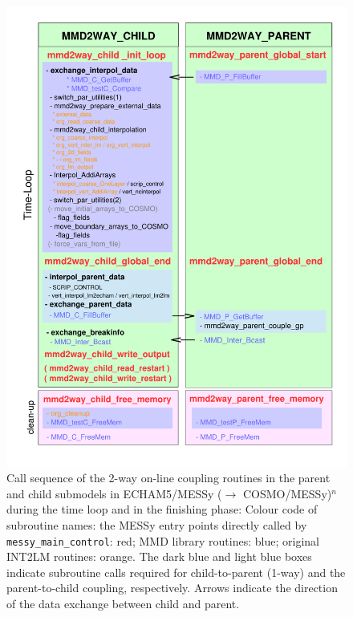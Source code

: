 \documentclass[11pt,twoside]{article}
\begin{document}
\begin{figure}
\begin{center} 
\vspace{-.3cm}
\includegraphics[height=0.9\textheight]{MMDUM_flowchart_timeloop.pdf} 
\end{center} 
\vspace{-.8cm}
\caption{Call sequence of the 2-way on-line coupling routines in the
parent and child submodels in 
ECHAM5/MESSy ($\rightarrow$ COSMO/MESSy)$^n$ during the time loop and
in the finishing phase:
 Colour code of subroutine names:  the MESSy entry points directly called by
 {\tt messy\_main\_control}: red; MMD library routines: blue; original
 INT2LM routines: orange. The dark blue and light blue boxes indicate
 subroutine calls required for child-to-parent (1-way) and
 the parent-to-child coupling, respectively.
 Arrows indicate the direction of the data exchange between child and parent.} 
\label{fig:call_tree_timeloop} 
\end{figure} 
\end{document}
